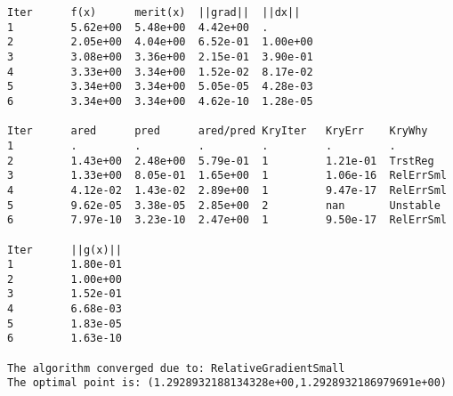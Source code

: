 \begin{lstlisting}[style=peoptOutput,caption={Output generated by PEOpt when running the simple equality example.  We explain this output in Chapter \ref{ch:Output}.},label=lst:simpleEqOut]
Iter      f(x)      merit(x)  ||grad||  ||dx||    
1         5.62e+00  5.48e+00  4.42e+00  .         
2         2.05e+00  4.04e+00  6.52e-01  1.00e+00  
3         3.08e+00  3.36e+00  2.15e-01  3.90e-01  
4         3.33e+00  3.34e+00  1.52e-02  8.17e-02  
5         3.34e+00  3.34e+00  5.05e-05  4.28e-03  
6         3.34e+00  3.34e+00  4.62e-10  1.28e-05  

Iter      ared      pred      ared/pred KryIter   KryErr    KryWhy    
1         .         .         .         .         .         .         
2         1.43e+00  2.48e+00  5.79e-01  1         1.21e-01  TrstReg   
3         1.33e+00  8.05e-01  1.65e+00  1         1.06e-16  RelErrSml 
4         4.12e-02  1.43e-02  2.89e+00  1         9.47e-17  RelErrSml 
5         9.62e-05  3.38e-05  2.85e+00  2         nan       Unstable  
6         7.97e-10  3.23e-10  2.47e+00  1         9.50e-17  RelErrSml 

Iter      ||g(x)||  
1         1.80e-01  
2         1.00e+00  
3         1.52e-01  
4         6.68e-03  
5         1.83e-05  
6         1.63e-10  
                    
The algorithm converged due to: RelativeGradientSmall
The optimal point is: (1.2928932188134328e+00,1.2928932186979691e+00)
\end{lstlisting}
